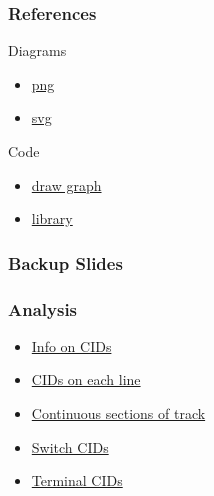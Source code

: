\documentclass[t]{beamer}
\begin{document}
\begin{frame}
\frametitle{References}


\begin{block}{Diagrams}
\begin{itemize}
\item \href{https://https://github.com/contractdesign/wmata/blob/master/doc/all.png}{png}
\item \href{https://https://github.com/contractdesign/wmata/blob/master/doc/all.svg}{svg}
\end{itemize}
\end{block}

\begin{block}{Code}
\begin{itemize}
\item \href{https://github.com/contractdesign/wmata/blob/master/doc/make_segments.py}{draw graph}
\item \href{https://github.com/contractdesign/wmata/blob/master/doc/wmata.py}{library}
\end{itemize}
\end{block}


\end{frame}



\begin{frame}
\frametitle{Backup Slides}


\end{frame}


\begin{frame}
\frametitle{Analysis}

\begin{itemize}
\item \href{https://https://github.com/contractdesign/wmata/blob/master/doc/types.txt}{Info on CIDs}
\item \href{https://https://github.com/contractdesign/wmata/blob/master/doc/CircuitIds.txt}{CIDs on each line}
\item \href{https://https://github.com/contractdesign/wmata/blob/master/doc/track_segments.txt}{Continuous sections of track}
\item \href{https://https://github.com/contractdesign/wmata/blob/master/doc/switches.txt}{Switch CIDs}
\item \href{https://https://github.com/contractdesign/wmata/blob/master/doc/ends.txt}{Terminal CIDs}

\end{itemize}


\end{frame}
\end{document}
